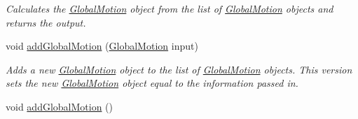 \begin{DoxyCompactItemize}
\begin{DoxyCompactList}\small\item\em Calculates the \hyperlink{classosea_1_1ofreq_1_1_global_motion}{Global\-Motion} object from the list of \hyperlink{classosea_1_1ofreq_1_1_global_motion}{Global\-Motion} objects and returns the output. \end{DoxyCompactList}\item 
void \hyperlink{classosea_1_1ofreq_1_1_outputs_body_a29af17e822ec8fe1a397403752d0ff1a}{add\-Global\-Motion} (\hyperlink{classosea_1_1ofreq_1_1_global_motion}{Global\-Motion} input)
\begin{DoxyCompactList}\small\item\em Adds a new \hyperlink{classosea_1_1ofreq_1_1_global_motion}{Global\-Motion} object to the list of \hyperlink{classosea_1_1ofreq_1_1_global_motion}{Global\-Motion} objects. This version sets the new \hyperlink{classosea_1_1ofreq_1_1_global_motion}{Global\-Motion} object equal to the information passed in. \end{DoxyCompactList}\item 
\hypertarget{classosea_1_1ofreq_1_1_outputs_body_a889dcf6d9be6e910c110018e0a309eae}{void \hyperlink{classosea_1_1ofreq_1_1_outputs_body_a889dcf6d9be6e910c110018e0a309eae}{add\-Global\-Motion} ()}\label{classosea_1_1ofreq_1_1_outputs_body_a889dcf6d9be6e910c110018e0a309eae}


\end{DoxyCompactItemize}
